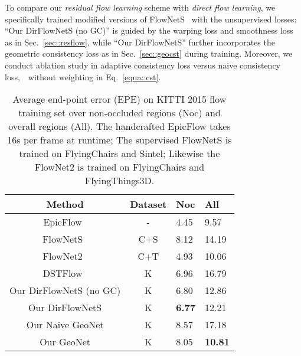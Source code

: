 \documentclass[10pt,twocolumn,letterpaper]{article}
\begin{document}
To compare our \textit{residual flow learning} scheme with \textit{direct flow learning}, we specifically trained modified versions of FlowNetS~\cite{FischerDIHHGSCB15} with the unsupervised losses: ``Our DirFlowNetS (no GC)'' is guided by the warping loss and smoothness loss as in Sec.~\ref{sec::resflow}, while ``Our DirFlowNetS'' further incorporates the geometric consistency loss as in Sec.~\ref{sec::geocst} during training.
Moreover, we conduct ablation study in adaptive consistency loss versus naive consistency loss,~\ie~without weighting in Eq.~\eqref{equa::cst}.

\begin{table}
\begin{center}
\setlength{\tabcolsep}{5.0pt}
\begin{tabular*}{1.0\linewidth}{c|c|p{1.1cm}<{\centering}|p{1.1cm}<{\centering}}
\toprule
Method & Dataset & Noc & All \\
\hline
EpicFlow~\cite{revaud2015epicflow} & - & 4.45 & 9.57 \\
FlowNetS~\cite{FischerDIHHGSCB15} & C+S & 8.12 & 14.19 \\
FlowNet2~\cite{IMKDB17} & C+T & 4.93 & 10.06 \\
\hline
DSTFlow~\cite{Ren2017UnsupervisedDL} & K & 6.96 & 16.79 \\
Our DirFlowNetS (no GC) & K & 6.80 & 12.86  \\
Our DirFlowNetS & K & \bf{6.77} & 12.21  \\
Our Naive GeoNet & K & 8.57 & 17.18  \\
Our GeoNet & K & 8.05 & \bf{10.81}  \\
\bottomrule
\end{tabular*}
\end{center}
\caption{Average end-point error (EPE) on KITTI 2015 flow training set over non-occluded regions (Noc) and overall regions (All). The handcrafted EpicFlow takes 16s per frame at runtime; The supervised FlowNetS is trained on FlyingChairs and Sintel; Likewise the FlowNet2 is trained on FlyingChairs and FlyingThings3D.}
\label{tab::flow}
\vspace{-3ex}
\end{table}%
\end{document}
